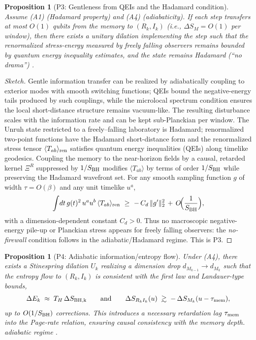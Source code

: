 \documentclass[11pt,a4paper]{article}
\newcommand{\ie}{\textit{i.e.}\xspace}
\theoremstyle{plain}
\newtheorem{proposition}[theorem]{Proposition}
\theoremstyle{definition}
\theoremstyle{remark}
\begin{document}
\begin{proposition}[P3: Gentleness from QEIs and the Hadamard condition]
\label{prop:P3-gentle}
Assume (A1) (Hadamard property) and (A4) (adiabaticity). If each step transfers at most $O(1)$ qubits from the memory to $(R_k,I_k)$
(\ie, $\Delta S_M=O(1)$ per window), then there exists a unitary dilation implementing the step such that the renormalized stress-energy
measured by freely falling observers remains bounded by quantum energy inequality estimates, and the state remains Hadamard
(``no drama'') \cite{Radzikowski:1996, Fewster:2012}.
\end{proposition}
\begin{proof}[Sketch]
Gentle information transfer can be realized by adiabatically coupling to exterior modes with smooth switching functions; QEIs bound the
negative-energy tails produced by such couplings, while the microlocal spectrum condition ensures the local short-distance structure
remains vacuum-like. The resulting disturbance scales with the information rate and can be kept sub-Planckian per window.
The Unruh state restricted to a freely--falling laboratory is Hadamard; renormalized two-point functions have the Hadamard short-distance form and the renormalized stress tensor $\langle T_{ab}\rangle_{\rm ren}$ satisfies quantum energy inequalities (QEIs) along timelike geodesics. Coupling the memory to the near-horizon fields by a causal, retarded kernel $\Xi^R$ suppressed by $1/S_{\rm BH}$ modifies $\langle T_{ab}\rangle$ by terms of order $1/S_{\rm BH}$ while preserving the Hadamard wavefront set. For any smooth sampling function $g$ of width $\tau=O(\beta)$ and any unit timelike $u^a$,
\begin{equation}
\int\!dt\,g(t)^2\,u^a u^b\,\langle T_{ab}\rangle_{\rm ren} \ \ge\ -\,C_d\,\|g'\|_2^2 \,+\,O\!\Big(\frac{1}{S_{\rm BH}}\Big),
\end{equation}
with a dimension-dependent constant $C_d>0$. Thus no macroscopic negative-energy pile-up or Planckian stress appears for freely falling observers: the \emph{no-firewall} condition follows in the adiabatic/Hadamard regime. This is P3.
\end{proof}
\begin{proposition}[P4: Adiabatic information/entropy flow]
\label{prop:P4-adiabatic}
Under (A4), there exists a Stinespring dilation $U_k$ realizing a dimension drop $d_{M_{k-1}}\!\to d_{M_k}$ such that the entropy flow to
$(R_k,I_k)$ is consistent with the first law and Landauer-type bounds,
\[
\Delta E_k \;\approx\; T_H\,\Delta S_{\rm BH,k}\qquad\text{and}\qquad \Delta S_{R_k I_k}(u)\;\gtrsim\; -\,\Delta S_{M_k}(u - \tau_{\rm mem}),
\]
up to $O(1/S_{\rm BH})$ corrections. This introduces a necessary \emph{retardation lag} $\tau_{\rm mem}$ into the Page-rate relation, ensuring causal consistency with the memory depth.
adiabatic regime \cite{Page:1993, BrownYork:1993, Brandao:2016}.
\end{proposition}
\end{document}

